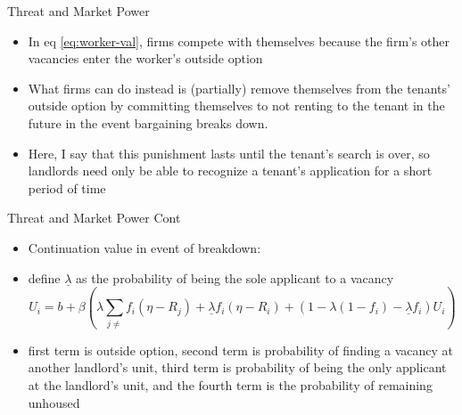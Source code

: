 \documentclass[10pt, xcolor=dvipsnames]{beamer}
\begin{document}
\begin{frame}{Threat and Market Power}
    \begin{itemize}
    \item In eq \ref{eq:worker-val}, firms compete with themselves because the firm's other vacancies enter the worker's outside option
    \item What firms can do instead is (partially) remove themselves from the tenants' outside option by committing themselves to not renting to the tenant in the future in the event bargaining breaks down.
    \item Here, I say that this punishment lasts until the tenant's search is over, so landlords need only be able to recognize a tenant's application for a short period of time
    \end{itemize}
\end{frame}

\begin{frame}{Threat and Market Power Cont}
    \begin{itemize}
         \item Continuation value in event of breakdown:
        \item define $\underline{\lambda}$ as the probability of being the sole applicant to a vacancy
        \begin{equation}\label{eq:match-val}
            U_i = b + \beta \left(\lambda\sum_{j\neq}f_i(\eta - R_j) + \underline{\lambda} f_i(\eta - R_i) + (1-\lambda(1-f_i) - \underline{\lambda} f_i)U_i\right)
        \end{equation}
        \item first term is outside option, second term is probability of finding a vacancy at another landlord's unit, third term is probability of being the only applicant at the landlord's unit, and the fourth term is the probability of remaining unhoused
    \end{itemize}
\end{frame}
\end{document}
